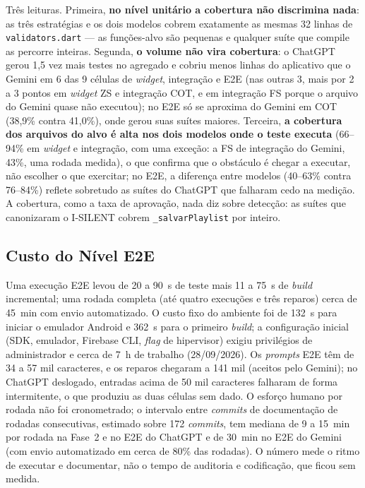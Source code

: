 \documentclass[12pt]{article}
\begin{document}
Três leituras. Primeira, \textbf{no nível unitário a cobertura não
discrimina nada}: as três estratégias e os dois modelos cobrem exatamente as
mesmas 32 linhas de \texttt{validators.dart} --- as funções-alvo são pequenas e
qualquer suíte que compile as percorre inteiras. Segunda, \textbf{o volume
não vira cobertura}: o ChatGPT gerou 1,5 vez mais testes no agregado e
cobriu menos linhas do aplicativo que o Gemini em 6 das 9 células de
\textit{widget}, integração e E2E (nas outras 3, mais por 2 a 3 pontos em
\textit{widget} ZS e integração COT, e em integração FS porque o arquivo do
Gemini quase não executou); no E2E só se aproxima do Gemini em COT (38,9\%
contra 41,0\%), onde gerou suas suítes maiores. Terceira, \textbf{a
cobertura dos arquivos do alvo é alta nos dois modelos onde o teste
executa} (66--94\% em \textit{widget} e integração, com uma exceção: a FS
de integração do Gemini, 43\%, uma rodada medida), o que confirma que o
obstáculo é chegar a executar, não escolher o que exercitar; no E2E, a
diferença entre modelos (40--63\% contra 76--84\%) reflete sobretudo as
suítes do ChatGPT que falharam cedo na medição. A cobertura, como a taxa de
aprovação, nada diz sobre detecção: as suítes que canonizaram o I-SILENT
cobrem \texttt{\_salvarPlaylist} por inteiro.

\subsection{Custo do Nível E2E}
\label{subsec:res-custo}

Uma execução E2E levou de 20 a 90~s de teste mais 11 a 75~s de
\textit{build} incremental; uma rodada completa (até quatro execuções e três
reparos) cerca de 45~min com envio automatizado. O custo fixo do ambiente
foi de 132~s para iniciar o emulador Android e 362~s para o primeiro
\textit{build}; a configuração inicial (SDK, emulador, Firebase CLI, \textit{flag}
de hipervisor) exigiu privilégios de administrador e cerca de 7~h de trabalho
(28/09/2026). Os
\textit{prompts} E2E têm de 34 a 57 mil caracteres, e os reparos chegaram a
141 mil (aceitos pelo Gemini); no ChatGPT deslogado, entradas acima de 50 mil
caracteres falharam de forma intermitente, o que produziu as duas células
sem dado. O esforço humano por rodada não foi cronometrado; o intervalo
entre \textit{commits} de documentação de rodadas consecutivas, estimado
sobre 172 \textit{commits}, tem mediana de 9 a 15~min por rodada na Fase~2 e
no E2E do ChatGPT e de 30~min no E2E do Gemini (com envio automatizado em
cerca de 80\% das rodadas). O número mede o ritmo de executar e documentar,
não o tempo de auditoria e codificação, que ficou sem medida.
\end{document}
